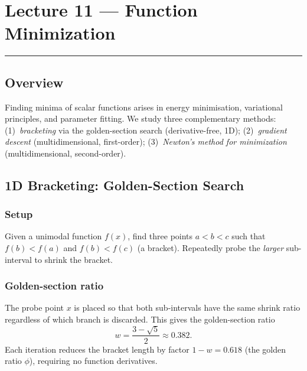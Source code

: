 
\section{Lecture 11 — Function Minimization}\label{sec:lec11}
\hrule\vspace{1.5em}

\subsection*{Overview}
Finding minima of scalar functions arises in energy minimisation,
variational principles, and parameter fitting.  We study three
complementary methods: (1)~\emph{bracketing} via the golden-section
search (derivative-free, 1D); (2)~\emph{gradient descent}
(multidimensional, first-order); (3)~\emph{Newton's method for
minimization} (multidimensional, second-order).

\subsection{1D Bracketing: Golden-Section Search}\label{subsec:lec11:golden}

\subsubsection*{Setup}
Given a unimodal function $f(x)$, find three points $a<b<c$ such that
$f(b)<f(a)$ and $f(b)<f(c)$ (a bracket).  Repeatedly probe the
\emph{larger} sub-interval to shrink the bracket.

\subsubsection*{Golden-section ratio}
The probe point $x$ is placed so that both sub-intervals have the same
shrink ratio regardless of which branch is discarded.  This gives the
golden-section ratio
\begin{equation}
  w = \frac{3-\sqrt{5}}{2} \approx 0.382.
  \label{eq:lec11:golden}
\end{equation}
Each iteration reduces the bracket length by factor $1-w = 0.618$
(the golden ratio $\phi$), requiring no function derivatives.

